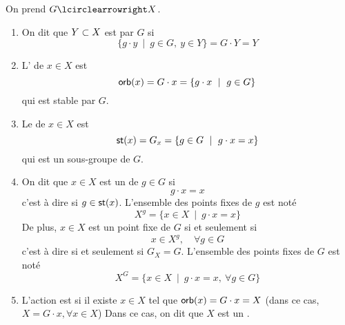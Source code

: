 \begin{definition}
    On prend \(G \act X\). 
    \begin{enumerate}
        \item On dit que \(Y\subset X\) est  par \(G\) si 
        \begin{equation*}
            \{g\cdot y\ \mid\ g\in G,\ y\in Y\} = G\cdot Y = Y
        \end{equation*}

        \item L' de \(x\in X\) est
        \begin{equation*}
            \orb(x) = G\cdot x= \{g\cdot x\ \mid\ g\in G\}
        \end{equation*}
        qui est stable par \(G\).

        \item Le  de \(x\in X\) est
        \begin{equation*}
            \operatorname{\mathsf{st}}(x) = G_x = \{g\in G\ \mid\ g\cdot x = x\}
        \end{equation*}
        qui est un sous-groupe de \(G\).

        \item On dit que \(x\in X\) est un  de \(g\in G\) si
        \begin{equation*}
            g\cdot x = x
        \end{equation*}
        c'est à dire si \(g\in\operatorname{\mathsf{st}}(x)\).
        L'ensemble des points fixes de \(g\) est noté
        \begin{equation*}
            X^g = \{x\in X\ \mid\ g\cdot x = x\}
        \end{equation*}
        De plus, \(x\in X\) est un point fixe de \(G\) si et seulement si
        \begin{equation*}
            x\in X^g,\quad\forall g\in G
        \end{equation*}
        c'est à dire si et seulement si \(G_X = G\). L'ensemble des points fixes de \(G\) est
        noté
        \begin{equation*}
            X^G = \{x\in X\ \mid\ g\cdot x = x,\ \forall g\in G\}
        \end{equation*}

        \item L'action est  si il existe \(x \in X\)
        tel que \(\operatorname{\mathsf{orb}}(x) = G\cdot x = X\) (dans ce cas, \(X = G\cdot x,\forall x\in X\))
        Dans ce cas, on dit que \(X\) est un .

    \end{enumerate}
\end{definition}


